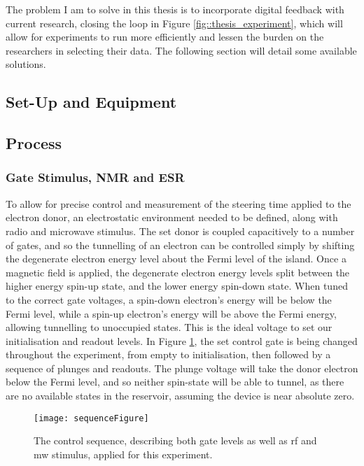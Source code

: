 The problem I am to solve in this thesis is to incorporate digital feedback with current research, closing the loop in Figure \ref{fig::thesis_experiment}, which will allow for experiments to run more efficiently and lessen the burden on the researchers in selecting their data. The following section will detail some available solutions.

\subsection{Set-Up and Equipment}

\subsection{Process}

	\subsubsection{Gate Stimulus, NMR and ESR}
		To allow for precise control and measurement of the steering time applied to the electron donor, an electrostatic environment needed to be defined, along with radio and microwave stimulus. The \gls{set} donor is coupled capacitively to a number of gates, and so the tunnelling of an electron can be controlled simply by shifting the degenerate electron energy level about the Fermi level of the island. Once a magnetic field is applied, the degenerate electron energy levels split between the higher energy spin-up state, and the lower energy spin-down state. When tuned to the correct gate voltages, a spin-down electron's energy will be below the Fermi level, while a spin-up electron's energy will be above the Fermi energy, allowing tunnelling to unoccupied states. This is the ideal voltage to set our initialisation and readout levels. In Figure \ref{fig::sequence}, the \gls{set} control gate is being changed throughout the experiment, from empty to initialisation, then followed by a sequence of plunges and readouts. The plunge voltage will take the donor electron below the Fermi level, and so neither spin-state will be able to tunnel, as there are no available states in the reservoir, assuming the device is near absolute zero.
		
		
		\begin{figure}[htbp!]
			\centering
			\texttt{[image: sequenceFigure]}
			\caption{The control sequence, describing both gate levels as well as \gls{rf} and \gls{mw} stimulus, applied for this experiment.}
			\label{fig::sequence}
		\end{figure}
		
